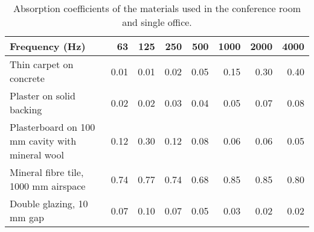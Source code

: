 \begin{table}[htbp]
	\caption{Absorption coefficients of the materials used in the conference room and single office.}
	\label{tbl:absorption}
	\centering
	\begin{tabular}{@{}lrrrrrrr@{}}
		\toprule
		Frequency (Hz) & 63 & 125 & 250 & 500 & 1000 & 2000 & 4000 \\ \midrule
		Thin carpet on concrete & 0.01 & 0.01 & 0.02 & 0.05 & 0.15 & 0.30 & 0.40 \\
		Plaster on solid backing & 0.02 & 0.02 & 0.03 & 0.04 & 0.05 & 0.07 & 0.08 \\
		Plasterboard on 100 mm cavity with mineral wool & 0.12 & 0.30 & 0.12 & 0.08 & 0.06 & 0.06 & 0.05 \\
		Mineral fibre tile, 1000 mm airspace & 0.74 & 0.77 & 0.74 & 0.68 & 0.85 & 0.85 & 0.80 \\
		Double glazing, 10 mm gap & 0.07 & 0.10 & 0.07 & 0.05 & 0.03 & 0.02 & 0.02 \\ \bottomrule
	\end{tabular}
\end{table}